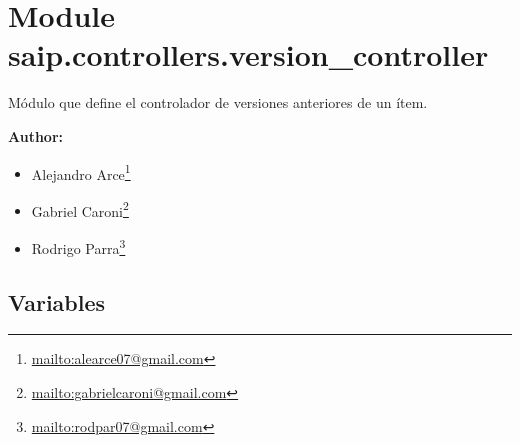 %
%
%


\section{Module saip.controllers.version\_controller}

    \label{saip:controllers:version_controller}
Módulo que define el controlador de versiones anteriores de un ítem.

\textbf{Author:} \begin{itemize}
\setlength{\parskip}{0.6ex}
  \item Alejandro 
    Arce\footnote{\href{mailto:alearce07@gmail.com}{mailto:alearce07@gmail.com}}

  \item Gabriel 
    Caroni\footnote{\href{mailto:gabrielcaroni@gmail.com}{mailto:gabrielcaroni@gmail.com}}

  \item Rodrigo 
    Parra\footnote{\href{mailto:rodpar07@gmail.com}{mailto:rodpar07@gmail.com}}

\end{itemize}





  \subsection{Variables}

